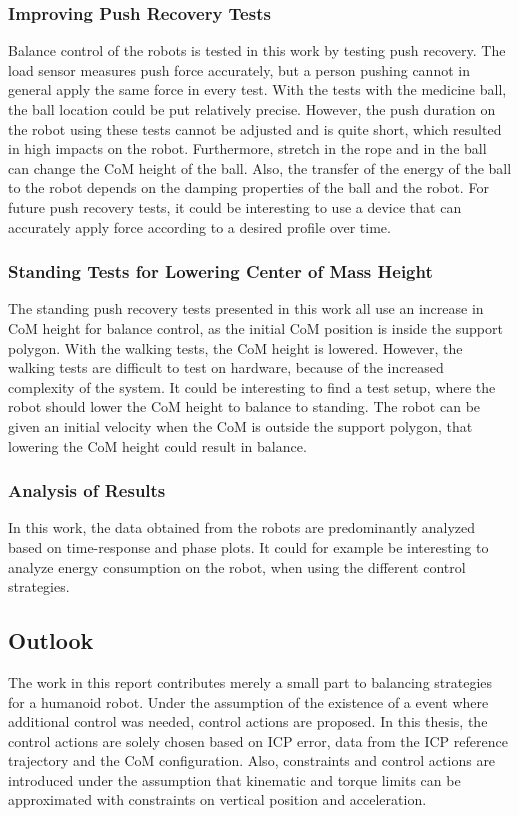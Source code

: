 \subsubsection{Improving Push Recovery Tests}
Balance control of the robots is tested in this work by testing push recovery. The load sensor measures push force accurately, but a person pushing cannot in general apply the same force in every test. With the tests with the medicine ball, the ball location could be put relatively precise. However, the push duration on the robot using these tests cannot be adjusted and is quite short, which resulted in high impacts on the robot. Furthermore, stretch in the rope and in the ball can change the \ac{CoM} height of the ball. Also, the transfer of the energy of the ball to the robot depends on the damping properties of the ball and the robot. For future push recovery tests, it could be interesting to use a device that can accurately apply force according to a desired profile over time.
\subsubsection{Standing Tests for Lowering Center of Mass Height}
The standing push recovery tests presented in this work all use an increase in \ac{CoM} height for balance control, as the initial \ac{CoM} position is inside the support polygon. With the walking tests, the \ac{CoM} height is lowered. However, the walking tests are difficult to test on hardware, because of the increased complexity of the system. It could be interesting to find a test setup, where the robot should lower the \ac{CoM} height to balance to standing. The robot can be given an initial velocity when the \ac{CoM} is outside the support polygon, that lowering the \ac{CoM} height could result in balance.
\subsubsection{Analysis of Results}
In this work, the data obtained from the robots are predominantly analyzed based on time-response and phase plots. It could for example be interesting to analyze energy consumption on the robot, when using the different control strategies. 

\subsection{Outlook}
The work in this report contributes merely a small part to balancing strategies for a humanoid robot. Under the assumption of the existence of a event where additional control was needed, control actions are proposed. In this thesis, the control actions are solely chosen based on \ac{ICP} error, data from the \ac{ICP} reference trajectory and the \ac{CoM} configuration. Also, constraints and control actions are introduced under the assumption that kinematic and torque limits can be approximated with constraints on vertical position and acceleration. 

